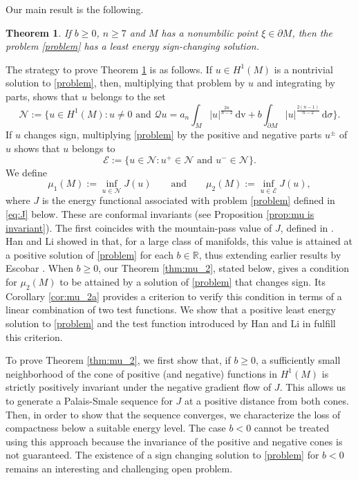 \documentclass[reqno,11pt,oneside]{amsart}
\newtheorem{theorem}{Theorem}[section]
\numberwithin{equation}{section}
\def\r{\mathbb{R}}
\def\im{\int_{M}}
\def\idm{\int_{\partial M}}
\def\cE{\mathcal{E}}
\def\cN{\mathcal{N}}
\def\d{\,\mathrm{d}}
\def\dv{\,\mathrm{dv}}
\begin{document}
Our main result is the following.

\begin{theorem} \label{thm:main}
If $b\geq 0$, $n\geq 7$ and $M$ has a nonumbilic point $\xi\in\partial M$, then the problem \eqref{problem} has a least energy sign-changing solution.
\end{theorem}

The strategy to prove Theorem \ref{thm:main} is as follows. If $u\in H^1(M)$ is a nontrivial solution to \eqref{problem}, then, multiplying that problem by $u$ and integrating by parts, shows that $u$ belongs to the set
$$\cN:=\Big\{u\in H^1(M): u\neq 0 \text{ and }\mathscr{Q} u=a_n\im|u|^\frac{2n}{n-2}\dv+b\idm |u|^\frac{2(n-1)}{n-2}\d \sigma\Big\}.$$
If $u$ changes sign, multiplying \eqref{problem} by the positive and negative parts $u^\pm$ of $u$ shows that $u$ belongs to
$$\cE:=\{u\in\cN:u^+\in\cN\text{ and }u^-\in\cN\}.$$ 
We define
$$\mu_1(M):=\inf_{u\in\cN}J(u)\qquad\text{and}\qquad\mu_2(M):=\inf_{u\in\cE}J(u),$$
where $J$ is the energy functional associated with problem \eqref{problem} defined in \eqref{eq:J} below. These are conformal invariants (see Proposition \ref{prop:mu is invariant}). The first coincides with the mountain-pass value of $J$, defined in \cite[p.812]{hl}. Han and Li showed in \cite{hl0,hl} that, for a large class of manifolds, this value is attained at a positive solution of \eqref{problem} for each $b\in\r$, thus extending earlier results by Escobar \cite{e1,e4}. When $b\geq 0$, our Theorem \ref{thm:mu_2}, stated below, gives a condition for $\mu_2(M)$ to be attained by a solution of \eqref{problem} that changes sign. Its Corollary \ref{cor:mu_2a} provides a criterion to verify this condition in terms of a linear combination of two test functions. We show that a positive least energy solution to \eqref{problem} and the test function introduced by Han and Li in \cite[(1.8)]{hl} fulfill this criterion. 

To prove Theorem \ref{thm:mu_2}, we first show that, if $b\geq 0$, a sufficiently small neighborhood of the cone of positive (and negative) functions in $H^1(M)$ is strictly positively invariant under the negative gradient flow of $J$. This allows us to generate a Palais-Smale sequence for $J$ at a positive distance from both cones. Then, in order to show that the sequence converges, we characterize the loss of compactness below a suitable energy level. The case $b<0$ cannot be treated using this approach because the invariance of the positive and negative cones is not guaranteed. The existence of a sign changing solution to \eqref{problem} for $b<0$ remains an interesting and challenging open problem.
\end{document}
